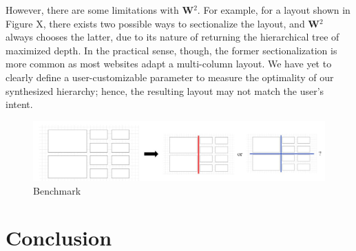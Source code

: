 \documentclass[runningheads]{llncs}
\newcommand{\W}{\textbf{W}$^2$ }
\begin{document}
However, there are some limitations with \textbf{W}$^2$. For example, for a layout shown in Figure X, there exists two possible ways to sectionalize the layout, and \W always chooses the latter, due to its nature of returning the hierarchical tree of maximized depth. In the practical sense, though, the former sectionalization is more common as most websites adapt a multi-column layout. We have yet to clearly define a user-customizable parameter to measure the optimality of our synthesized hierarchy; hence, the resulting layout may not match the user's intent.
\begin{figure}[H]
  \vspace*{-0.1in}
  \includegraphics[width=1\textwidth]{src/limit.JPG}
  \caption{Benchmark}
\end{figure}


\section{Conclusion}
\end{document}
